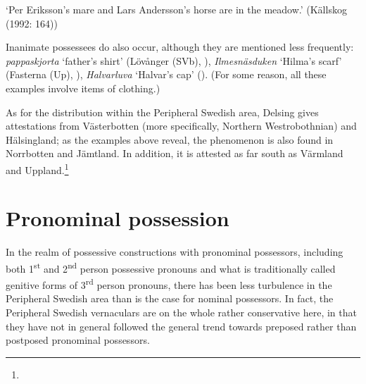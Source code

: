 \begin{styleTranslation}
‘Per Eriksson’s mare and Lars Andersson’s horse are in the meadow.’ (Källskog (1992: 164))

\end{styleTranslation}

\begin{styleBodyTextFirst}
Inanimate possessees do also occur, although they are mentioned less frequently: \textit{pappaskjorta} ‘father’s shirt’ (Lövånger (SVb), \citet{Holm1942}), \textit{Ilmesnäsduken} ‘Hilma’s scarf’ (Fasterna (Up), \citet[134]{Tiselius1902}), \textit{Halvarluva} ‘Halvar’s cap’ (\citet{Oscarsson2007}). (For some reason, all these examples involve items of clothing.)

\end{styleBodyTextFirst}

\begin{styleBodytextC}
As for the distribution within the Peripheral Swedish area, Delsing gives attestations from Västerbotten (more specifically, Northern Westrobothnian) and Hälsingland; as the examples above reveal, the phenomenon is also found in Norrbotten and Jämtland. In addition, it is attested as far south as Värmland and Uppland.\footnote{}

\end{styleBodytextC}

\section{Pronominal possession}

\begin{styleBodyTextFirst}
In the realm of possessive constructions with pronominal possessors, including both 1\textsuperscript{st} and 2\textsuperscript{nd} person possessive pronouns and what is traditionally called genitive forms of 3\textsuperscript{rd} person pronouns, there has been less turbulence in the Peripheral Swedish area than is the case for nominal possessors. In fact, the Peripheral Swedish vernaculars are on the whole rather conservative here, in that they have not in general followed the general trend towards preposed rather than postposed pronominal possessors. 

\end{styleBodyTextFirst}


